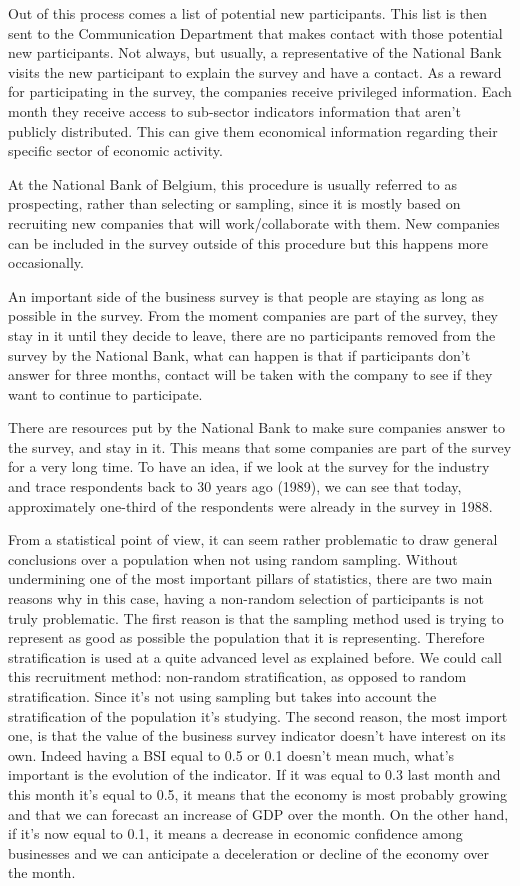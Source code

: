\documentclass[12pt,a4paper,oneside]{book}
\begin{document}
Out of this process comes a list of potential new participants. This list is then sent to the Communication Department that makes contact with those potential new participants. 
Not always, but usually, a representative of the National Bank visits the new participant to explain the survey and have a contact.
As a reward for participating in the survey, the companies receive privileged information. Each month they receive access to sub-sector indicators information that aren't publicly distributed. This can give them economical information regarding their specific sector of economic activity.

At the National Bank of Belgium, this procedure is usually referred to as prospecting, rather than selecting or sampling, since it is mostly based on recruiting new companies that will work/collaborate with them. New companies can be included in the survey outside of this procedure but this happens more occasionally.


An important side of the business survey is that people are staying as long as possible in the survey.
From the moment companies are part of the survey, they stay in it until they decide to leave, there are no participants removed from the survey by the National Bank, what can happen is that if participants don't answer for three months, contact will be taken with the company to see if they want to continue to participate.

There are resources put by the National Bank to make sure companies answer to the survey, and stay in it.
This means that some companies are part of the survey for a very long time.
To have an idea, if we look at the survey for the industry and trace respondents back to 30 years ago (1989), we can see that today, approximately one-third of the respondents were already in the survey in 1988. 


From a statistical point of view, it can seem rather problematic to draw general conclusions over a population when not using random sampling.
Without undermining one of the most important pillars of statistics, there are two main reasons why in this case, having a non-random selection of participants is not truly problematic.
The first reason is that the sampling method used is trying to represent as good as possible the population that it is representing. Therefore stratification is used at a quite advanced level as explained before. 
We could call this recruitment method: non-random stratification, as opposed to random stratification. Since it's not using sampling but takes into account the stratification of the population it's studying.
The second reason, the most import one, is that the value of the business survey indicator doesn't have interest on its own. Indeed having a BSI equal to 0.5 or 0.1 doesn't mean much, what's important is the evolution of the indicator. If it was equal to 0.3 last month and this month it's equal to 0.5, it means that the economy is most probably growing and that we can forecast an increase of GDP over the month. On the other hand, if it's now equal to 0.1, it means a decrease in economic confidence among businesses and we can anticipate a deceleration or decline of the economy over the month.
\end{document}
